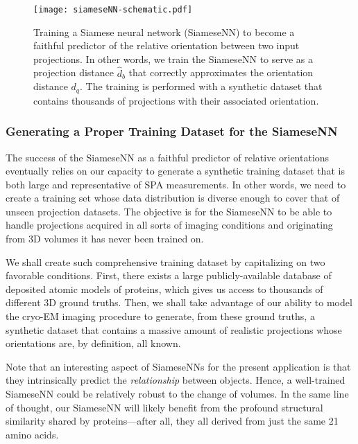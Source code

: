 \begin{figure}[t!]
    \centering
   \texttt{[image: siameseNN-schematic.pdf]}
    \caption{Training a Siamese neural network (SiameseNN) to become a faithful predictor of the relative orientation between two input projections. In other words, we train the SiameseNN to serve as a projection distance $\widehat{d}_b$ that correctly approximates the orientation distance $d_q$. The training is performed with a synthetic dataset that contains thousands of projections with their associated orientation.}
    \label{fig:siamese-schematic}
\end{figure}

\subsubsection{Generating a Proper Training Dataset for the SiameseNN}
\label{sec:training-siamese}

The success of the SiameseNN as a faithful predictor of relative orientations eventually relies on our capacity to generate a synthetic training dataset that is both large and representative of SPA measurements. In other words, we need to create a training set whose data distribution is diverse enough to cover that of unseen projection datasets. The objective is for the SiameseNN to be able to handle projections acquired in all sorts of imaging conditions and originating from 3D volumes it has never been trained on.

We shall create such comprehensive training dataset by capitalizing on two favorable conditions. First, there exists a large publicly-available database of deposited atomic models of proteins, which gives us access to thousands of different 3D ground truths. Then, we shall take advantage of our ability to model the cryo-EM imaging procedure to generate, from these ground truths, a synthetic dataset that contains a massive amount of realistic projections whose orientations are, by definition, all known.

Note that an interesting aspect of SiameseNNs for the present application is that they intrinsically predict the \textit{relationship} between objects. Hence, a well-trained SiameseNN could be relatively robust to the change of volumes. In the same line of thought, our SiameseNN will likely benefit from the profound structural similarity shared by proteins---after all, they all derived from just the same 21 amino acids.


